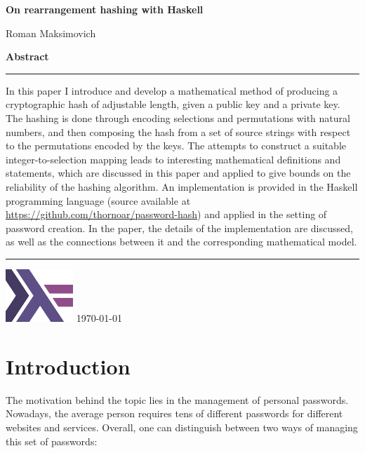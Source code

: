 \documentclass[12pt, a4paper]{article}
\begin{document}

\thispagestyle{empty}
\vspace*{.6in}
{ \Huge\bfseries On rearrangement hashing with Haskell }\par
\vspace*{.1in}
{ \Large Roman Maksimovich }
\par
\vspace*{3.5in}
{ \Large\bfseries Abstract }\par
\vspace*{.1in}
\hrule
\vspace*{.1in}
\begin{minipage}{0.9\textwidth}
    In this paper I introduce and develop a mathematical method of producing a cryptographic hash of adjustable length, given a public key and a private key. The hashing is done through encoding selections and permutations with natural numbers, and then composing the hash from a set of source strings with respect to the permutations encoded by the keys. The attempts to construct a suitable integer-to-selection mapping leads to interesting mathematical definitions and statements, which are discussed in this paper and applied to give bounds on the reliability of the hashing algorithm. An implementation is provided in the Haskell programming language (source available at \url{https://github.com/thornoar/password-hash}) and applied in the setting of password creation. In the paper, the details of the implementation are discussed, as well as the connections between it and the corresponding mathematical model.
\end{minipage}
\vspace*{.1in}
\hrule
\vspace*{.2in}
\begin{center}
    \includegraphics[width = 1in]{./figures/haskell.png}
    \vfill
    \today
\end{center}

\newpage
\tableofcontents
\newpage

\section{Introduction}

The motivation behind the topic lies in the management of personal passwords. Nowadays, the average person requires tens of different passwords for different websites and services. Overall, one can distinguish between two ways of managing this set of passwords:
\end{document}
